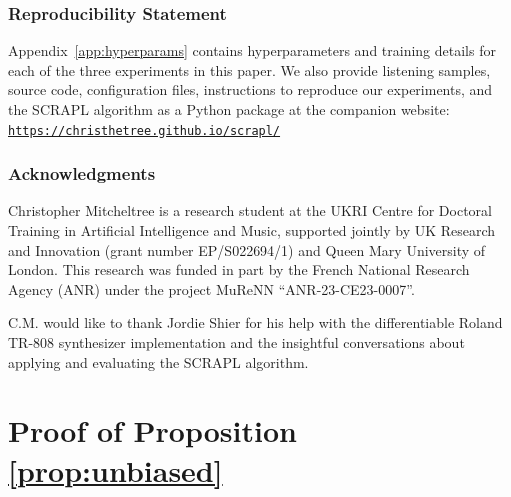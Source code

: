 \documentclass{article} %
\theoremstyle{plain}
\theoremstyle{definition}
\theoremstyle{remark}
\begin{document}
\clearpage


\subsubsection*{Reproducibility Statement}

 Appendix~\ref{app:hyperparams} contains hyperparameters and training details for each of the three experiments in this paper.
 We also provide listening samples, source code, configuration files, instructions to reproduce our experiments, and the SCRAPL algorithm as a Python package at the companion website:\\ \texttt{\url{https://christhetree.github.io/scrapl/}}




\subsubsection*{Acknowledgments}

Christopher Mitcheltree is a research student at the UKRI Centre for Doctoral Training in Artificial Intelligence and Music, supported jointly by UK Research and Innovation (grant number EP/S022694/1) and Queen Mary University of London.
This research was funded in part by the French National Research Agency (ANR) under the project MuReNN ``ANR-23-CE23-0007''.

C.M. would like to thank Jordie Shier for his help with the differentiable Roland TR-808 synthesizer implementation and the insightful conversations about applying and evaluating the SCRAPL algorithm.  


{
\small


}

\clearpage


\appendix

\section{Proof of Proposition \ref{prop:unbiased}}
\label{app:scrapl_proof}
\end{document}
